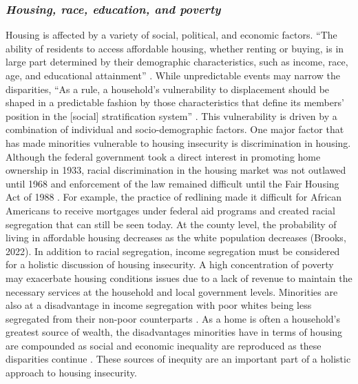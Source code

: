  

\subsubsection{\textit{Housing, race, education, and poverty}} 

 

Housing is affected by a variety of social, political, and economic factors. “The ability of residents to access affordable housing, whether renting or buying, is in large part determined by their demographic characteristics, such as income, race, age, and educational attainment” \citep[115]{yadavalli_comprehensive_2020}. While unpredictable events may narrow the disparities, “As a rule, a household’s vulnerability to displacement should be shaped in a predictable fashion by those characteristics that define its members’ position in the [social] stratification system” \citep[5]{lee_forced_2020}. This vulnerability is driven by a combination of individual and socio-demographic factors. One major factor that has made minorities vulnerable to housing insecurity is discrimination in housing. Although the federal government took a direct interest in promoting home ownership in 1933, racial discrimination in the housing market was not outlawed until 1968 and enforcement of the law remained difficult until the Fair Housing Act of 1988 \citep{sharp_emerging_2014}. For example, the practice of redlining made it difficult for African Americans to receive mortgages under federal aid programs and created racial segregation that can still be seen today. At the county level, the probability of living in affordable housing decreases as the white population decreases (Brooks, 2022). In addition to racial segregation, income segregation must be considered for a holistic discussion of housing insecurity. A high concentration of poverty may exacerbate housing conditions issues due to a lack of revenue to maintain the necessary services at the household and local government levels. Minorities are also at a disadvantage in income segregation with poor whites being less segregated from their non-poor counterparts \citep{lichter_ruralurban_2021}. As a home is often a household's greatest source of wealth, the disadvantages minorities have in terms of housing are compounded as social and economic inequality are reproduced as these disparities continue \citep{krivo_housing_2004}. These sources of inequity are an important part of a holistic approach to housing insecurity.  

 

